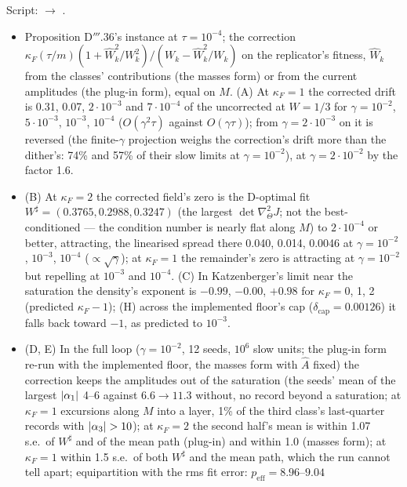 Script:  $\to$ .
\begin{itemize}
  \item Proposition D$'''$.36's instance at $\tau = 10^{-4}$; the correction
    $\kappa_F(\tau/m)(1 + \hat W_k^2/W_k^2)/(W_k - \hat W_k^2/W_k)$ on the replicator's fitness, $\hat W_k$ from the
    classes' contributions (the masses form) or from the current amplitudes (the plug-in form), equal on $M$. (A) At
    $\kappa_F = 1$ the corrected drift is 0.31, 0.07, $2\cdot10^{-3}$ and $7\cdot10^{-4}$ of the uncorrected at
    $W = 1/3$ for $\gamma = 10^{-2}$, $5\cdot10^{-3}$, $10^{-3}$, $10^{-4}$ ($O(\gamma^2\tau)$ against
    $O(\gamma\tau)$); from $\gamma = 2\cdot10^{-3}$ on it is reversed (the finite-$\gamma$ projection weighs the
    correction's drift more than the dither's: 74\% and 57\% of their slow limits at $\gamma = 10^{-2}$), at
    $\gamma = 2\cdot10^{-2}$ by the factor 1.6.
  \item (B) At $\kappa_F = 2$ the corrected field's zero is the D-optimal fit $W^\sharp = (0.3765, 0.2988, 0.3247)$
    (the largest $\det\nabla^2_\Theta J$; not the best-conditioned --- the condition number is nearly flat along $M$)
    to $2\cdot10^{-4}$ or better, attracting, the linearised spread there 0.040, 0.014, 0.0046 at $\gamma = 10^{-2}$,
    $10^{-3}$, $10^{-4}$ ($\propto\sqrt\gamma$); at $\kappa_F = 1$ the remainder's zero is attracting at
    $\gamma = 10^{-2}$ but repelling at $10^{-3}$ and $10^{-4}$. (C) In Katzenberger's limit near the saturation the
    density's exponent is $-0.99$, $-0.00$, $+0.98$ for $\kappa_F = 0$, 1, 2 (predicted $\kappa_F - 1$); (H) across
    the implemented floor's cap ($\delta_{\mathrm{cap}} = 0.00126$) it falls back toward $-1$, as predicted to
    $10^{-3}$.
  \item (D, E) In the full loop ($\gamma = 10^{-2}$, 12 seeds, $10^6$ slow units; the plug-in form re-run with the
    implemented floor, the masses form with $\hat A$ fixed) the correction keeps the amplitudes out of the saturation
    (the seeds' mean of the largest $\lvert \alpha_1\rvert$ 4--6 against $6.6\to11.3$ without, no record beyond a saturation;
    at $\kappa_F = 1$ excursions along $M$ into a layer, 1\% of the third class's last-quarter records with
    $\lvert \alpha_3\rvert > 10$); at $\kappa_F = 2$ the second half's mean is within 1.07 s.e.\ of $W^\sharp$ and of the mean
    path (plug-in) and within 1.0 (masses form); at $\kappa_F = 1$ within 1.5 s.e.\ of both $W^\sharp$ and the mean
    path, which the run cannot tell apart; equipartition with the rms fit error: $p_{\mathrm{eff}} = 8.96$--$9.04$

\end{itemize}

